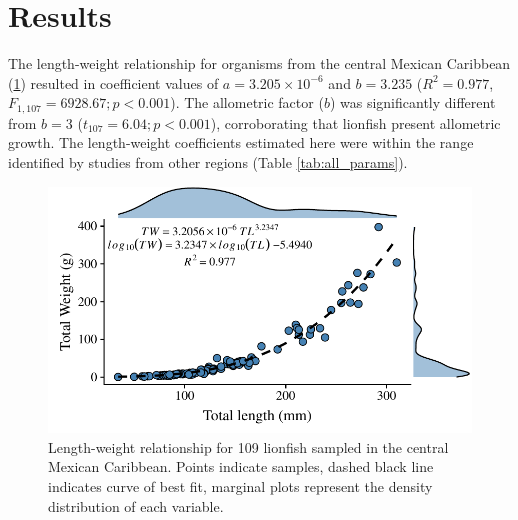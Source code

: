 \documentclass[fleqn,10pt,lineno]{wlpeerj} %
\begin{document}
\clearpage

\section*{Results}

The length-weight relationship for organisms from the central Mexican
Caribbean (\ref{fig:l-w-carib}) resulted in coefficient values of
\(a = 3.205 \times 10^{-6}\) and \(b = 3.235\) (\(R^2 = 0.977\),
\(F_{1, 107} = 6928.67; p < 0.001\)). The allometric factor (\(b\)) was
significantly different from \(b = 3\) (\(t_{107} = 6.04; p<0.001\)),
corroborating that lionfish present allometric growth. The length-weight
coefficients estimated here were within the range identified by studies
from other regions (Table \ref{tab:all_params}).

\begin{figure}
\centering
\includegraphics{Manuscript_files/figure-latex/fit1-1.pdf}
\caption{\label{fig:l-w-carib}Length-weight relationship for 109
lionfish sampled in the central Mexican Caribbean. Points indicate
samples, dashed black line indicates curve of best fit, marginal plots
represent the density distribution of each variable.}
\end{figure}
\end{document}
